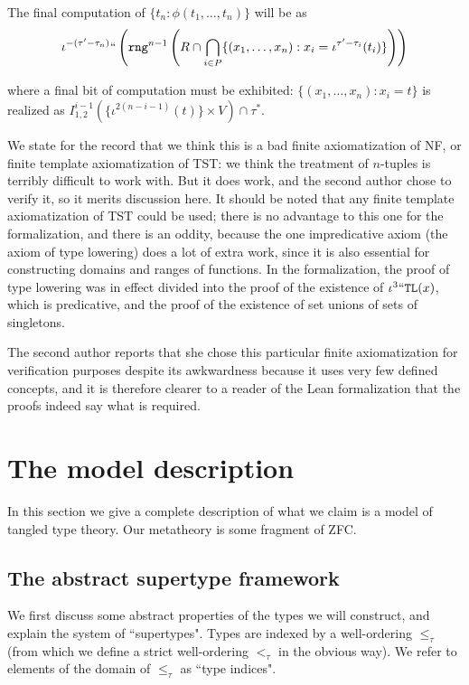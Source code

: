 \documentclass{article}
\theoremstyle{definition}
\theoremstyle{remark}
\begin{document}
The final computation of $\{t_n:\phi(t_1,\ldots,t_n)\}$ will be as
$$\iota^{-(\tau'-\tau_{n})}``\left({\tt rng}^{n-1}\left(R \cap \bigcap_{i \in P}\{(x_1,\ldots,x_n):x_i = \iota^{\tau'-\tau_i}(t_i)\}\right)\right)$$



where a final bit of computation must be exhibited:  $\{(x_1,\ldots,x_n):x_i = t\}$ is realized as
$I^{i-1}_{1,2}(\{\iota^{2(n-i-1)}(t)\}\times V)\cap \tau^*.$

We state for the record that we think this is a bad finite axiomatization of NF, or finite template axiomatization of TST:  we think the treatment of $n$-tuples is terribly difficult to work with.  But it does work, and the second author chose to verify it, so it merits discussion here.  It should be noted that any finite template axiomatization of TST could be used;  there is no advantage to this one for the formalization, and there is an oddity, because the one impredicative axiom (the axiom of type lowering) does a lot of extra work, since it is also essential for constructing domains and ranges of functions.  In the formalization, the proof of type lowering was in effect divided into the proof of the existence of $\iota^3``{\tt TL}(x)$, which is predicative, and the proof of the existence of set unions of sets of singletons.

The second author reports that she chose this particular finite axiomatization for verification purposes despite its awkwardness because it uses very few defined concepts, and it is therefore clearer to a reader of the Lean formalization that the proofs indeed say what is required.



\newpage

\section{The model description}\label{s:model_description}


In this section we give a complete description of what we claim is a model of tangled type theory.  Our metatheory is some fragment of ZFC.

\subsection{The abstract supertype framework}
\label{ss:supertype_framework}


{We first discuss some abstract properties of the types we will construct, and explain the system of ``supertypes".}
Types are indexed by a well-ordering $\leq_\tau$ (from which we define a strict well-ordering $<_\tau$ in the obvious way).
We refer to elements of the domain of $\leq_\tau$ as ``type indices".
\end{document}
